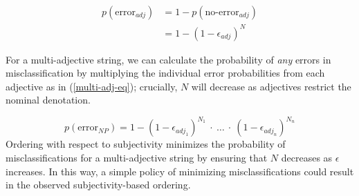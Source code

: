 \documentclass[preprint,authoryear]{elsarticle}\frenchspacing
\begin{document}
\setcounter{equation}{3}
\begin{align}
p(\textrm{error}_{adj}) &= 1 - p(\textrm{no-error}_{adj}) \nonumber\\
&= 1 - (1-\epsilon_{adj})^N
\end{align}

For a multi-adjective string, we can calculate the probability of \emph{any} errors in misclassification by multiplying the individual error probabilities from each adjective as in (\ref{multi-adj-eq}); crucially, $N$ will decrease as adjectives restrict the nominal denotation. 

\begin{equation} \label{multi-adj-eq}
p(\textrm{error}_{N\!P}) = 1 - (1-\epsilon_{adj_1})^{N_1}\ \cdot\ \ldots\ \cdot\ (1-\epsilon_{adj_n})^{N_n}
\end{equation}
Ordering with respect to subjectivity minimizes the probability of misclassifications for a multi-adjective string by ensuring that $N$ decreases as $\epsilon$ increases. In this way, a simple policy of minimizing misclassifications could result in the observed subjectivity-based ordering. 
\end{document}
